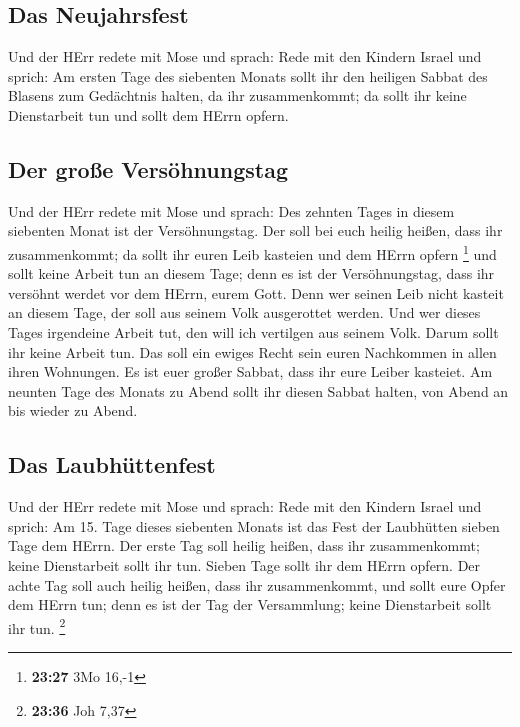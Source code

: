 \hypertarget{das-neujahrsfest}{%
\subsection{Das Neujahrsfest}\label{das-neujahrsfest}}

 Und der HErr redete mit Mose und sprach: 
Rede mit den Kindern Israel und sprich: Am ersten Tage des siebenten
Monats sollt ihr den heiligen Sabbat des Blasens zum Gedächtnis halten,
da ihr zusammenkommt;  da sollt ihr keine Dienstarbeit
tun und sollt dem HErrn opfern.

\hypertarget{der-grouxdfe-versuxf6hnungstag}{%
\subsection{Der große
Versöhnungstag}\label{der-grouxdfe-versuxf6hnungstag}}

 Und der HErr redete mit Mose und sprach: 
Des zehnten Tages in diesem siebenten Monat ist der Versöhnungstag. Der
soll bei euch heilig heißen, dass ihr zusammenkommt; da sollt ihr euren
Leib kasteien und dem HErrn opfern \footnote{\textbf{23:27} 3Mo 16,-1}
 und sollt keine Arbeit tun an diesem Tage; denn es ist
der Versöhnungstag, dass ihr versöhnt werdet vor dem HErrn, eurem Gott.
 Denn wer seinen Leib nicht kasteit an diesem Tage, der
soll aus seinem Volk ausgerottet werden.  Und wer dieses
Tages irgendeine Arbeit tut, den will ich vertilgen aus seinem Volk.
 Darum sollt ihr keine Arbeit tun. Das soll ein ewiges
Recht sein euren Nachkommen in allen ihren Wohnungen.  Es
ist euer großer Sabbat, dass ihr eure Leiber kasteiet. Am neunten Tage
des Monats zu Abend sollt ihr diesen Sabbat halten, von Abend an bis
wieder zu Abend.

\hypertarget{das-laubhuxfcttenfest}{%
\subsection{Das Laubhüttenfest}\label{das-laubhuxfcttenfest}}

 Und der HErr redete mit Mose und sprach: 
Rede mit den Kindern Israel und sprich: Am 15. Tage dieses siebenten
Monats ist das Fest der Laubhütten sieben Tage dem HErrn.
 Der erste Tag soll heilig heißen, dass ihr
zusammenkommt; keine Dienstarbeit sollt ihr tun.  Sieben
Tage sollt ihr dem HErrn opfern. Der achte Tag soll auch heilig heißen,
dass ihr zusammenkommt, und sollt eure Opfer dem HErrn tun; denn es ist
der Tag der Versammlung; keine Dienstarbeit sollt ihr tun. \footnote{\textbf{23:36}
  Joh 7,37}

